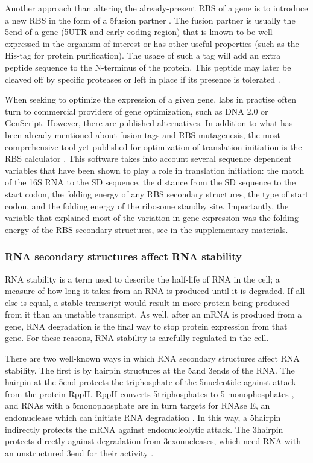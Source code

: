 Another approach than altering the already-present RBS of a gene is to
introduce a new RBS in the form of a 5\p fusion partner
\cite{lavallie_gene_1995}. The fusion partner is usually the 5\p end of a gene
(5\p UTR and early coding region) that is known to be well expressed in the
organism of interest or has other useful properties (such as the His-tag for
protein purification). The usage of such a tag will add an extra peptide
sequence to the N-terminus of the protein. This peptide may later be cleaved
off by specific proteases or left in place if its presence is tolerated
\cite{esposito_enhancement_2006}.

When seeking to optimize the expression of a given gene, labs in practise often
turn to commercial providers of gene optimization, such as DNA 2.0 or
GenScript. However, there are published alternatives. In addition to what has
been already mentioned about fusion tags and RBS mutagenesis, the most
comprehensive tool yet published for optimization of translation initiation
is the RBS calculator \cite{salis_automated_2009}. This software takes into
account several sequence dependent variables that have been shown to play a
role in translation initiation: the match of the 16S RNA to the SD sequence,
the distance from the SD sequence to the start codon, the folding energy of any
RBS secondary structures, the type of start codon, and the folding energy of
the ribosome standby site. Importantly, the variable that explained most of the
variation in gene expression was the folding energy of the RBS secondary
structures, see \cite{salis_automated_2009} in the supplementary materials.

\subsubsection{RNA secondary structures affect RNA stability}
RNA stability is a term used to describe the half-life of RNA in the cell; a
measure of how long it takes from an RNA is produced until it is degraded. If
all else is equal, a stable transcript would result in more protein being
produced from it than an unstable transcript. As well, after an mRNA is
produced from a gene, RNA degradation is the final way to stop protein
expression from that gene. For these reasons, RNA stability is carefully
regulated in the cell.

There are two well-known ways in which RNA secondary structures affect RNA
stability. The first is by hairpin structures at the 5\p and 3\p ends of the
RNA. The hairpin at the 5\p end protects the triphosphate of the 5\p nucleotide
against attack from the protein RppH. RppH converts 5\p triphosphates to 5\p
monophosphates \cite{deana_bacterial_2008}, and RNAs with a 5\p monophosphate
are in turn targets for RNAse E, an endonuclease which can initiate RNA
degradation \cite{mackie_ribonuclease_1998}. In this way, a 5\p hairpin
indirectly protects the mRNA against endonucleolytic attack. The 3\p hairpin
protects directly against degradation from 3\p exonucleases, which need RNA
with an unstructured 3\p end for their activity \cite{rauhut_mrna_1999}.

